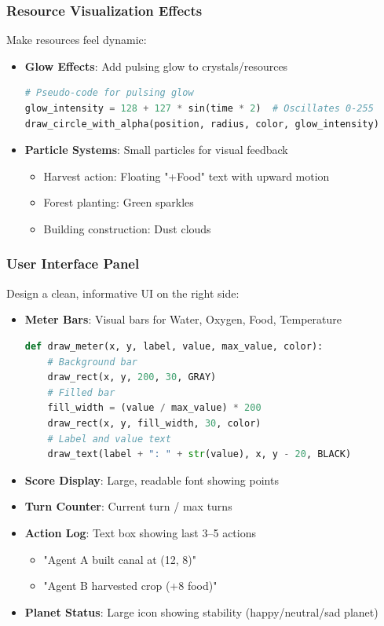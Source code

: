 \documentclass[12pt,a4paper]{article}
\begin{document}
\subsubsection{Resource Visualization Effects}

Make resources feel dynamic:

\begin{itemize}
    \item \textbf{Glow Effects}: Add pulsing glow to crystals/resources
    \begin{lstlisting}[language=Python]
# Pseudo-code for pulsing glow
glow_intensity = 128 + 127 * sin(time * 2)  # Oscillates 0-255
draw_circle_with_alpha(position, radius, color, glow_intensity)
    \end{lstlisting}
    
    \item \textbf{Particle Systems}: Small particles for visual feedback
    \begin{itemize}
        \item Harvest action: Floating "+Food" text with upward motion
        \item Forest planting: Green sparkles
        \item Building construction: Dust clouds
    \end{itemize}
\end{itemize}

\subsubsection{User Interface Panel}

Design a clean, informative UI on the right side:

\begin{itemize}
    \item \textbf{Meter Bars}: Visual bars for Water, Oxygen, Food, Temperature
    \begin{lstlisting}[language=Python]
def draw_meter(x, y, label, value, max_value, color):
    # Background bar
    draw_rect(x, y, 200, 30, GRAY)
    # Filled bar
    fill_width = (value / max_value) * 200
    draw_rect(x, y, fill_width, 30, color)
    # Label and value text
    draw_text(label + ": " + str(value), x, y - 20, BLACK)
    \end{lstlisting}
    
    \item \textbf{Score Display}: Large, readable font showing points
    \item \textbf{Turn Counter}: Current turn / max turns
    \item \textbf{Action Log}: Text box showing last 3--5 actions
    \begin{itemize}
        \item "Agent A built canal at (12, 8)"
        \item "Agent B harvested crop (+8 food)"
    \end{itemize}
    \item \textbf{Planet Status}: Large icon showing stability (happy/neutral/sad planet)
\end{itemize}
\end{document}
